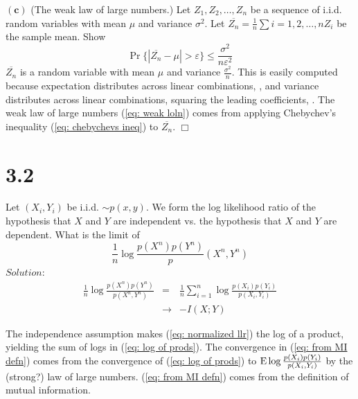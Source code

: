 \documentclass[10pt]{article}
\DeclareMathOperator*{\E}{\mbox{\text{E}}}
\newcommand{\pref}[1]{{(\ref{#1})}}
\begin{document}
\begin{tiny}
\begin{multicols}{3}
$\mathbf{(c)}$
(The weak law of large numbers.) Let $Z_1,Z_2,\dots,Z_n$ be a sequence of
i.i.d. random variables with mean $\mu$ and variance $\sigma^2$. Let
$\overline{Z_n} = \frac{1}{n}\sum{i=1,2,\dots,n}Z_i$ be the sample mean.
Show 
\begin{equation}
    \Pr \{|\overline{Z_n} - \mu| > \varepsilon\} \leq
    \frac{\sigma^2}{n\varepsilon^2}
    \label{eq: weak loln}
\end{equation}
\proof
$\overline{Z_n}$ is a random variable with mean $\mu$ and variance
$\frac{\sigma^2}{n}$. This is easily computed because expectation
distributes across linear combinations, 
, and variance distributes across linear combinations, squaring the
leading coefficients,
. The weak law of large numbers \pref{eq: weak loln} comes from applying
Chebychev's inequality \pref{eq: chebychevs ineq} to $\overline{Z_n}$.
$\Box$

\section*{3.2}
Let $(X_i,Y_i)$ be i.i.d. $\sim p(x,y)$. We form the log likelihood ratio
of the hypothesis that $X$ and $Y$ are independent vs. the hypothesis that
$X$ and $Y$ are dependent. What is the limit of
\begin{equation}
    \frac{1}{n}\log \frac{p(X^n)p(Y^n)}p(X^n,Y^n)
    \label{eq: normalized llr}
\end{equation}
$Solution$:
\begin{eqnarray}
    \frac{1}{n}\log \frac{p(X^n)p(Y^n)}{p(X^n,Y^n)}
    &=& \frac{1}{n} \sum_{i=1}^{n} \log \frac{p(X_i)p(Y_i)}{p(X_i,Y_i)}
    \label{eq: log of prods} \\
    &\rightarrow& -I(X;Y) 
    \label{eq: from MI defn}
\end{eqnarray}

The independence assumption makes \pref{eq: normalized llr} the log of a
product, yielding the sum of logs in \pref{eq: log of prods}.
The convergence in \pref{eq: from MI defn} comes from the convergence of
\pref{eq: log of prods} to $\E \log \frac{p(X_i)p(Y_i)}{p(X_i,Y_i)}$ by
the (strong?) law of large numbers. \pref{eq: from MI defn} comes from the
definition of mutual information.


\end{multicols}
\end{tiny}
\end{document}
